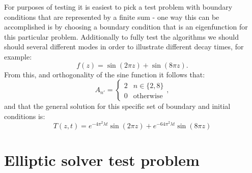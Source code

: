 \documentclass[11pt,letterpaper]{article}
\begin{document}
For purposes of testing it is easiest to pick a test problem with boundary conditions that are represented by a finite sum - one way this can be accomplished is by choosing a boundary condition that is an eigenfunction for this particular problem.  Additionally to fully test the algorithms we should should several different modes in order to illustrate different decay times, for example:  
\begin{equation}
 f(z) = \sin(2 \pi z) + \sin(8 \pi z).
\end{equation}
From this, and orthogonality of the sine function it follows that:
\begin{equation}
A_{n'} = \left\{ \begin{array}{cc} 2 & n \in \{2,8\} \\ 0 & \mathrm{otherwise}  \end{array} \right. ,
\end{equation}
and that the general solution for this specific set of boundary and initial conditions is:  
\begin{equation}
T(z,t) = e^{-4 \pi^2 \lambda t} \sin \left( 2 \pi z \right)+e^{-64 \pi^2 \lambda t} \sin \left( 8 \pi z \right)
\end{equation}



\section{Elliptic solver test problem}
\end{document}
